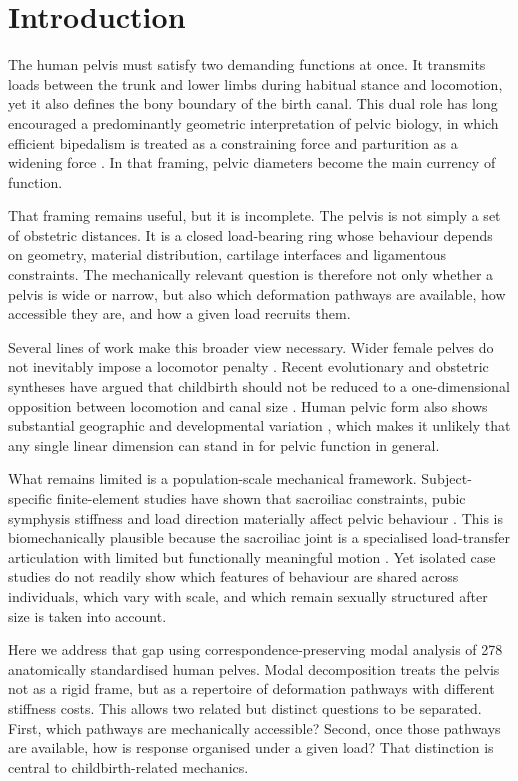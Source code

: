 \documentclass[openacc]{rsproca_new}
\begin{document}
\section{Introduction}
The human pelvis must satisfy two demanding functions at once. It transmits loads between the trunk and lower limbs during habitual stance and locomotion, yet it also defines the bony boundary of the birth canal. This dual role has long encouraged a predominantly geometric interpretation of pelvic biology, in which efficient bipedalism is treated as a constraining force and parturition as a widening force \cite{ros2002,tre2015,gru2023}. In that framing, pelvic diameters become the main currency of function.

That framing remains useful, but it is incomplete. The pelvis is not simply a set of obstetric distances. It is a closed load-bearing ring whose behaviour depends on geometry, material distribution, cartilage interfaces and ligamentous constraints. The mechanically relevant question is therefore not only whether a pelvis is wide or narrow, but also which deformation pathways are available, how accessible they are, and how a given load recruits them.

Several lines of work make this broader view necessary. Wider female pelves do not inevitably impose a locomotor penalty \cite{war2015}. Recent evolutionary and obstetric syntheses have argued that childbirth should not be reduced to a one-dimensional opposition between locomotion and canal size \cite{gru2023,pav2020}. Human pelvic form also shows substantial geographic and developmental variation \cite{bet2018,ver2017,nov2020}, which makes it unlikely that any single linear dimension can stand in for pelvic function in general.

What remains limited is a population-scale mechanical framework. Subject-specific finite-element studies have shown that sacroiliac constraints, pubic symphysis stiffness and load direction materially affect pelvic behaviour \cite{eic2011,ham2013}. This is biomechanically plausible because the sacroiliac joint is a specialised load-transfer articulation with limited but functionally meaningful motion \cite{vle2012}. Yet isolated case studies do not readily show which features of behaviour are shared across individuals, which vary with scale, and which remain sexually structured after size is taken into account.

Here we address that gap using correspondence-preserving modal analysis of 278 anatomically standardised human pelves. Modal decomposition treats the pelvis not as a rigid frame, but as a repertoire of deformation pathways with different stiffness costs. This allows two related but distinct questions to be separated. First, which pathways are mechanically accessible? Second, once those pathways are available, how is response organised under a given load? That distinction is central to childbirth-related mechanics.
\end{document}
